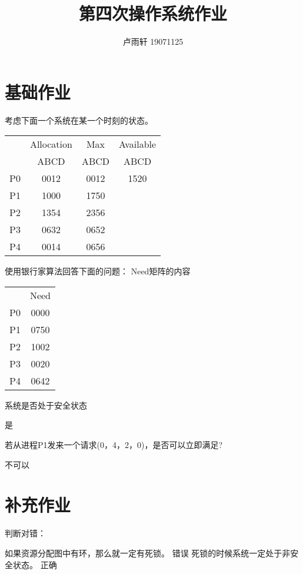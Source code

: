 \documentclass{ctexart}
\title{第四次操作系统作业}
\author{卢雨轩 19071125}
\begin{document}
\maketitle

\section*{基础作业}

\begin{outline}[enumerate]
    \1 考虑下面一个系统在某一个时刻的状态。
    \begin{center}
        \begin{tabular}{c c c c}
            & Allocation & Max & Available \\
            & ABCD & ABCD & ABCD \\
            P0 & 0012 & 0012 & 1520 \\
            P1 & 1000 & 1750 \\
            P2 & 1354 & 2356 \\
            P3 & 0632 & 0652 \\
            P4 & 0014 & 0656 \\
        \end{tabular}
    \end{center}
        使用银行家算法回答下面的问题：
        \2 Need矩阵的内容
            \begin{center}
                \begin{tabular}{c c}
                    & Need \\
                    P0 & 0000 \\
                    P1 & 0750 \\
                    P2 & 1002 \\
                    P3 & 0020 \\
                    P4 & 0642 \\
                \end{tabular}
            \end{center}
        \2 系统是否处于安全状态
            
            是
        
        \2 若从进程P1发来一个请求(0，4，2，0)，是否可以立即满足?

            不可以


\end{outline}

\section*{补充作业}
判断对错：
\begin{outline}
    \1 如果资源分配图中有环，那么就一定有死锁。 
        错误
    \1 死锁的时候系统一定处于非安全状态。
        正确
\end{outline}
\end{document}

